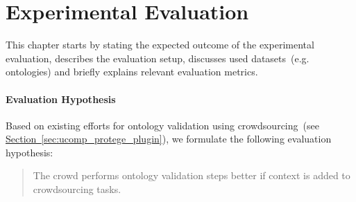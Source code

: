 \chapter{Experimental Evaluation}
This chapter starts by stating the expected outcome of the experimental evaluation, describes the evaluation setup, discusses used datasets~(e.g. ontologies) and briefly explains relevant evaluation metrics. 

\subsubsection{Evaluation Hypothesis}
Based on existing efforts for ontology validation using crowdsourcing~(see \hyperref[sec:ucomp_protege_plugin]{Section~\ref*{sec:ucomp_protege_plugin}}), we formulate the following evaluation hypothesis:
\begin{quotation}
	The crowd performs ontology validation steps better if context is added to crowdsourcing tasks.
\end{quotation}






